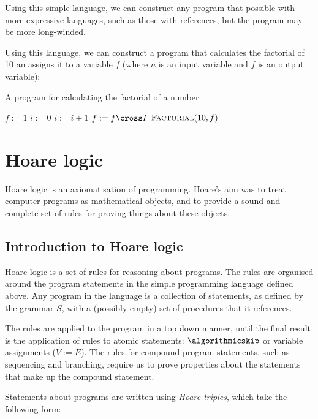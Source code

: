 Using this simple language, we can construct any program that possible with more expressive languages, such as those with references, but the program may be more long-winded. 

\begin{example}
Using this language, we can construct a program that calculates the factorial of 10 an assigns it to a variable $f$ (where $n$ is an input variable and $f$ is an output variable):

\begin{algorithm}[h]
\caption{A program for calculating the factorial of a number}
\begin{algorithmic}[0]
\State $f := 1$
\State $i := 0$
   \State $i := i + 1$
   \State $f := f \cross I$
\EndWhile
\EndProcedure
\State $\textsc{Factorial}(10, f)$
\end{algorithmic}
\end{algorithm}
\end{example}

\section{Hoare logic}

Hoare logic \cite{hoare69} is an axiomatisation of programming. Hoare's aim was to treat computer programs as mathematical objects, and to provide a sound and complete set of rules for proving things about these objects.

\subsection{Introduction to Hoare logic}

Hoare logic is a set of rules for reasoning about programs. The rules are organised around the program statements in the simple programming language defined above. Any program in the language is a collection of statements, as defined by the grammar $S$, with a (possibly empty) set of procedures that it references. 

The rules are applied to the program in a top down manner, until the final result is the application of rules to atomic statements: $\algorithmicskip$ or variable assignments ($V := E$). The rules for compound program statements, such as sequencing and branching, require us to prove properties about the statements that make up the compound statement.

Statements about  programs are written using {\em Hoare triples}, which take the following form:

